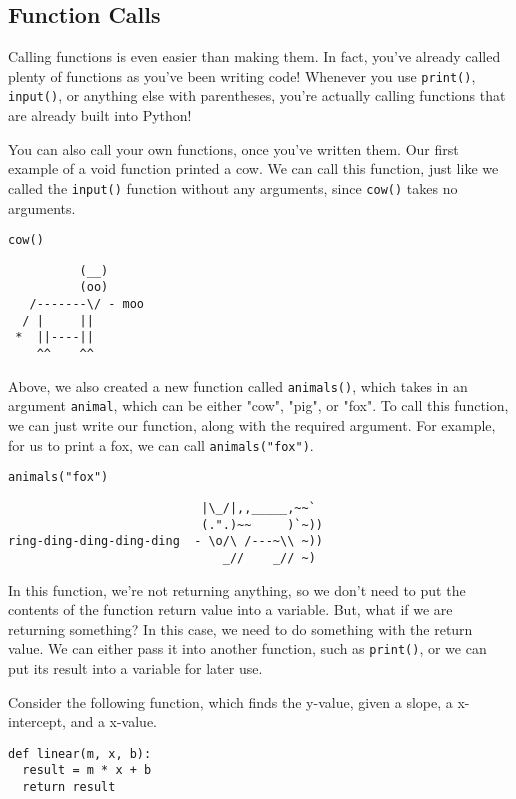 \subsection{Function Calls}
Calling functions is even easier than making them. In fact, you've already called plenty of functions as you've been writing code! Whenever you use \verb|print()|, \verb|input()|, or anything else with parentheses, you're actually calling functions that are already built into Python!\par
You can also call your own functions, once you've written them. Our first example of a void function printed a cow. We can call this function, just like we called the \verb|input()| function without any arguments, since \verb|cow()| takes no arguments.\par
\begin{lstlisting}[style=pippython]
cow()
\end{lstlisting}
\begin{lstlisting}
          (__)
          (oo)
   /-------\/ - moo
  / |     ||
 *  ||----||
    ^^    ^^
\end{lstlisting}
Above, we also created a new function called \verb|animals()|, which takes in an argument \verb|animal|, which can be either "cow", "pig", or "fox". To call this function, we can just write our function, along with the required argument. For example, for us to print a fox, we can call \verb|animals("fox")|.
\begin{lstlisting}[style=pippython]
animals("fox")
\end{lstlisting}
\begin{lstlisting}
                           |\_/|,,_____,~~`
                           (.".)~~     )`~))
ring-ding-ding-ding-ding  - \o/\ /---~\\ ~))
                              _//    _// ~)
\end{lstlisting}
In this function, we're not returning anything, so we don't need to put the contents of the function return value into a variable. But, what if we are returning something? In this case, we need to do something with the return value. We can either pass it into another function, such as \verb|print()|, or we can put its result into a variable for later use.\par
Consider the following function, which finds the y-value, given a slope, a x-intercept, and a x-value.\par
\begin{lstlisting}[style=pippython]
def linear(m, x, b):
  result = m * x + b
  return result
\end{lstlisting}
